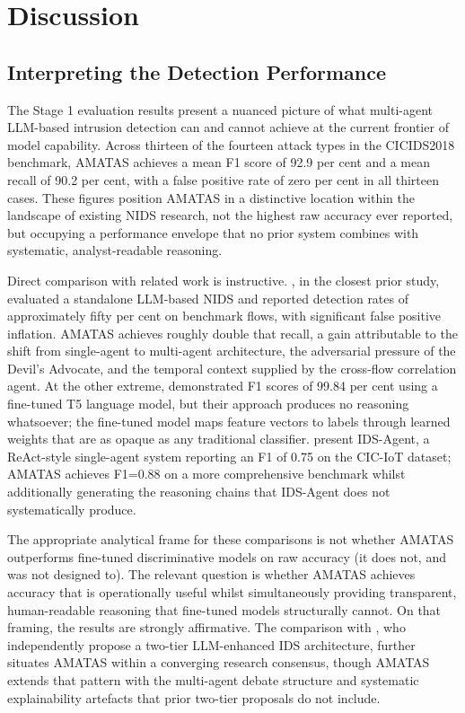 \chapter{Discussion}
\label{ch:discussion}

\section{Interpreting the Detection Performance}

The Stage 1 evaluation results present a nuanced picture of what multi-agent LLM-based intrusion detection can and cannot achieve at the current frontier of model capability. Across thirteen of the fourteen attack types in the CICIDS2018 benchmark, AMATAS achieves a mean F1 score of 92.9 per cent and a mean recall of 90.2 per cent, with a false positive rate of zero per cent in all thirteen cases. These figures position AMATAS in a distinctive location within the landscape of existing NIDS research, not the highest raw accuracy ever reported, but occupying a performance envelope that no prior system combines with systematic, analyst-readable reasoning.

Direct comparison with related work is instructive. \textcite{Houssel2024}, in the closest prior study, evaluated a standalone LLM-based NIDS and reported detection rates of approximately fifty per cent on benchmark flows, with significant false positive inflation. AMATAS achieves roughly double that recall, a gain attributable to the shift from single-agent to multi-agent architecture, the adversarial pressure of the Devil's Advocate, and the temporal context supplied by the cross-flow correlation agent. At the other extreme, \textcite{GutierrezGaleano2025} demonstrated F1 scores of 99.84 per cent using a fine-tuned T5 language model, but their approach produces no reasoning whatsoever; the fine-tuned model maps feature vectors to labels through learned weights that are as opaque as any traditional classifier. \textcite{Li2024} present IDS-Agent, a ReAct-style single-agent system reporting an F1 of 0.75 on the CIC-IoT dataset; AMATAS achieves F1=0.88 on a more comprehensive benchmark whilst additionally generating the reasoning chains that IDS-Agent does not systematically produce.

The appropriate analytical frame for these comparisons is not whether AMATAS outperforms fine-tuned discriminative models on raw accuracy (it does not, and was not designed to). The relevant question is whether AMATAS achieves accuracy that is operationally useful whilst simultaneously providing transparent, human-readable reasoning that fine-tuned models structurally cannot. On that framing, the results are strongly affirmative. The comparison with \textcite{Kalafatidis2025}, who independently propose a two-tier LLM-enhanced IDS architecture, further situates AMATAS within a converging research consensus, though AMATAS extends that pattern with the multi-agent debate structure and systematic explainability artefacts that prior two-tier proposals do not include.

